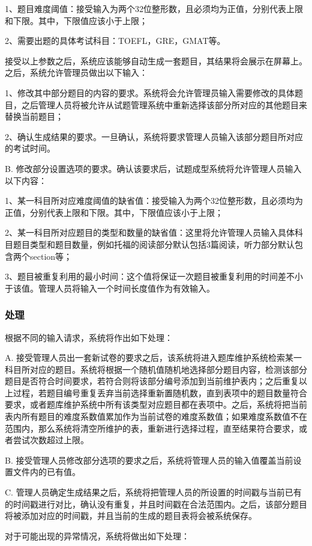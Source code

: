 1、题目难度阈值：接受输入为两个32位整形数，且必须均为正值，分别代表上限和下限。其中，下限值应该小于上限；

2、需要出题的具体考试科目：TOEFL，GRE，GMAT等。

接受以上参数之后，系统应该能够自动生成一套题目，其结果将会展示在屏幕上。之后，系统允许管理员做出以下输入：

1、修改其中部分题目的内容的要求。系统将会允许管理员输入需要修改的具体题目，之后管理人员将被允许从试题管理系统中重新选择该部分所对应的其他题目来替换当前题目；

2、确认生成结果的要求。一旦确认，系统将要求管理人员输入该部分题目所对应的考试时间。

B. 修改部分设置选项的要求。确认该要求后，试题成型系统将允许管理人员输入以下内容：

1、某一科目所对应难度阈值的缺省值：接受输入为两个32位整形数，且必须均为正值，分别代表上限和下限。其中，下限值应该小于上限；

2、某一科目所对应题目的类型和数量的缺省值：这里将允许管理人员输入具体科目题目类型和题目数量，例如托福的阅读部分默认包括3篇阅读，听力部分默认包含两个section等；

3、题目被重复利用的最小时间：这个值将保证一次题目被重复利用的时间差不小于该值。管理人员将输入一个时间长度值作为有效输入。

\subsubsection{处理}
根据不同的输入请求，系统将作出如下处理：

A. 接受管理人员出一套新试卷的要求之后，该系统将进入题库维护系统检索某一科目所对应的题目。系统将根据一个随机值随机地选择部分题目内容，检测该部分题目是否符合时间要求，若符合则将该部分编号添加到当前维护表内；之后重复以上过程，若题目编号重复丢弃当前选择重新置随机数，直到表项中的题目数量符合要求，或者题库维护系统中所有该类型对应题目都在表项中。之后，系统将把当前表内所有题目的难度系数值累加作为当前试卷的难度系数值；如果难度系数值不在范围内，那么系统将清空所维护的表，重新进行选择过程，直至结果符合要求，或者尝试次数超过上限。

B. 接受管理人员修改部分选项的要求之后，系统将管理人员的输入值覆盖当前设置文件内的已有值。

C. 管理人员确定生成结果之后，系统将把管理人员的所设置的时间戳与当前已有的时间戳进行对比，确认没有重复，并且时间戳在合法范围内。之后，该部分题目将被添加对应的时间戳，并且当前的生成的题目表将会被系统保存。

对于可能出现的异常情况，系统将做出如下处理：

